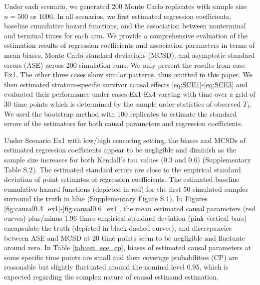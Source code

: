 \documentclass[APA,Times1COL]{WileyNJDv5} %
\theoremstyle{plain}
\begin{document}
\fi
Under each scenario, we generated $200$ Monte Carlo replicates with sample size $n=500$ or $1000$. In all scenarios, we first estimated regression coefficients, baseline cumulative hazard functions, and the association between nonterminal and terminal times for each arm.  We provide a comprehensive evaluation of the estimation results of regression coefficients and association parameters in terms of mean biases, Monte Carlo standard deviations (MCSD), and asymptotic standard errors (ASE) across 200 simulation runs. We only present the results from case Ex1. The other three cases show similar patterns, thus omitted in this paper. We then estimated stratum-specific survivor causal effects \eqref{eq:SCE1}-\eqref{eq:SCE3} and evaluated their performance under cases Ex1-Ex4 varying with time over a grid of 30 time points which is determined by the sample order statistics of observed $T_1$. We used the bootstrap method with 100 replicates to estimate the standard errors of the estimators for both causal parameters and regression coefficients. 


Under Scenario Ex1 with low/high censoring setting, the biases and MCSDs of estimated regression coefficients appear to be negligible and diminish as the sample size increases for both Kendall's tau values (0.3 and 0.6) (Supplementary Table S.2). The estimated standard errors are close to the empirical standard deviation of point estimates of regression coefficients. The estimated baseline cumulative hazard functions (depicted in red) for the first 50 simulated samples surround the truth in blue (Supplementary Figure S.1).  In Figures \ref{fig:causal0.3_ex1}-\ref{fig:causal0.6_ex1}, the mean estimated causal parameters (red curves)  plus/minus 1.96 times empirical standard deviation (pink vertical bars) encapsulate the truth (depicted in black dashed curves), and discrepancies between ASE and MCSD at 20 time points seem to be negligible and fluctuate around zero. In Table \ref{tab:est_sce_cp}, biases of estimated causal parameters at some specific time points are small and their coverage probabilities (CP) are reasonable but slightly fluctuated around the nominal level 0.95, which is expected regarding the complex nature of causal estimand estimation.
\end{document}
